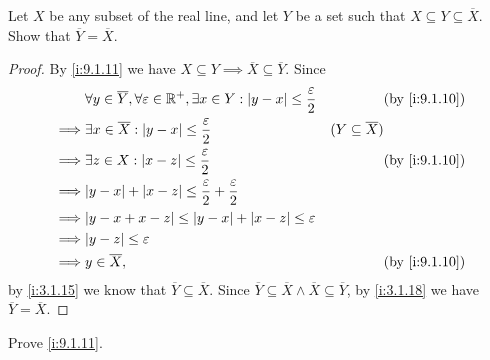 \exercisesection

\begin{ex}\label{i:ex:9.1.1}
  Let \(X\) be any subset of the real line, and let \(Y\) be a set such that \(X \subseteq Y \subseteq \overline{X}\).
  Show that \(\overline{Y} = \overline{X}\).
\end{ex}

\begin{proof}
  By \cref{i:9.1.11} we have \(X \subseteq Y \implies \overline{X} \subseteq \overline{Y}\).
  Since
  \begin{align*}
             & \forall y \in \overline{Y}, \forall \varepsilon \in \R^+, \exists x \in Y : \abs{y - x} \leq \dfrac{\varepsilon}{2} &                            & \by{i:9.1.10} \\
    \implies & \exists x \in \overline{X} : \abs{y - x} \leq \dfrac{\varepsilon}{2}                                                & (Y \subseteq \overline{X})                 \\
    \implies & \exists z \in X : \abs{x - z} \leq \dfrac{\varepsilon}{2}                                                           &                            & \by{i:9.1.10} \\
    \implies & \abs{y - x} + \abs{x - z} \leq \dfrac{\varepsilon}{2} + \dfrac{\varepsilon}{2}                                                                                   \\
    \implies & \abs{y - x + x - z} \leq \abs{y - x} + \abs{x - z} \leq \varepsilon                                                                                              \\
    \implies & \abs{y - z} \leq \varepsilon                                                                                                                                     \\
    \implies & y \in \overline{X},                                                                                                 &                            & \by{i:9.1.10}
  \end{align*}
  by \cref{i:3.1.15} we know that \(\overline{Y} \subseteq \overline{X}\).
  Since \(\overline{Y} \subseteq \overline{X} \land \overline{X} \subseteq \overline{Y}\), by \cref{i:3.1.18} we have \(\overline{Y} = \overline{X}\).
\end{proof}

\begin{ex}\label{i:ex:9.1.2}
  Prove \cref{i:9.1.11}.
\end{ex}

